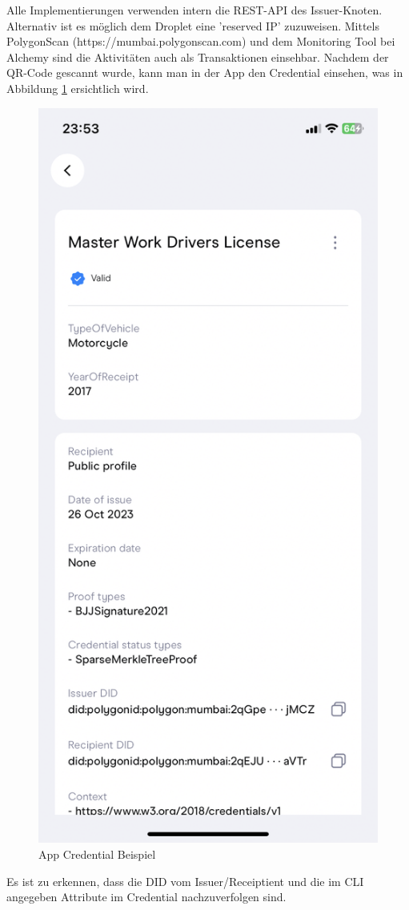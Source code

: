 \begin{itemize}
	Alle Implementierungen verwenden intern die REST-API des Issuer-Knoten. Alternativ ist es möglich dem Droplet eine 'reserved IP' zuzuweisen. Mittels PolygonScan (https://mumbai.polygonscan.com) und dem Monitoring Tool bei Alchemy sind die Aktivitäten auch als Transaktionen einsehbar. Nachdem der QR-Code gescannt wurde, kann man in der App den Credential einsehen, was in Abbildung \ref{fig:appCredential} ersichtlich wird.
	 \begin{figure}[H]
	 	\centering
	 	\includegraphics[scale=0.2]{media/appCredential}
	 	\caption{App Credential Beispiel}
	 	\label{fig:appCredential}
	 \end{figure}
	 
	 Es ist zu erkennen, dass die DID vom Issuer/Receiptient und die im CLI angegeben Attribute im Credential nachzuverfolgen sind.
	\end{itemize}
	 
